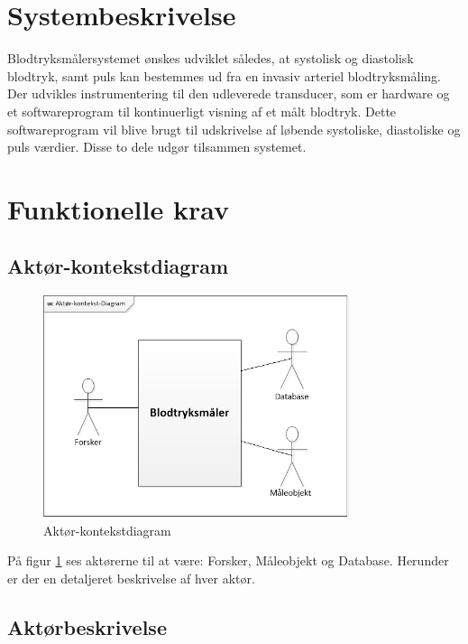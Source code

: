 \section{Systembeskrivelse}
Blodtryksmålersystemet ønskes udviklet således, at systolisk og diastolisk blodtryk, samt puls kan bestemmes ud fra en invasiv arteriel blodtryksmåling. Der udvikles instrumentering til den udleverede transducer, som er hardware og et softwareprogram til kontinuerligt visning af et målt blodtryk. Dette softwareprogram vil blive brugt til udskrivelse af løbende systoliske, diastoliske og puls værdier. Disse to dele udgør tilsammen systemet. 

\section{Funktionelle krav}
 

\subsection{Aktør-kontekstdiagram}


\begin{figure}[H]
	\centering
	\includegraphics[width=0.8\textwidth]{Figurer/Aktor-kontekst-diagram}
	\caption{Aktør-kontekstdiagram}
	\label{fig:aktoerbeskrivelse}
\end{figure}
På figur \ref{fig:aktoerbeskrivelse} ses aktørerne til at være: Forsker, Måleobjekt og Database. Herunder er der en detaljeret beskrivelse af hver aktør.


\subsection{Aktørbeskrivelse}

